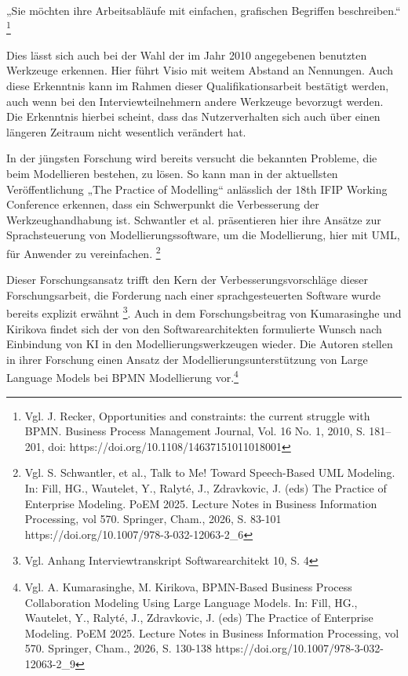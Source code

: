 „Sie möchten ihre Arbeitsabläufe mit einfachen, grafischen Begriffen beschreiben.“
\footnote {Vgl. J. Recker, Opportunities and constraints: the current struggle with BPMN. Business Process Management Journal, Vol. 16 No. 1, 2010, S. 181–201, doi: https://doi.org/10.1108/14637151011018001 }

Dies lässt sich auch bei der Wahl der im Jahr 2010 angegebenen benutzten Werkzeuge erkennen. Hier führt Visio mit weitem Abstand an Nennungen. Auch diese Erkenntnis kann im Rahmen dieser Qualifikationsarbeit bestätigt werden, auch wenn bei den Interviewteilnehmern andere Werkzeuge bevorzugt werden. Die Erkenntnis hierbei scheint, dass das Nutzerverhalten sich auch über einen längeren Zeitraum nicht wesentlich verändert hat.

In der jüngsten Forschung wird bereits versucht die bekannten Probleme, die beim Modellieren bestehen, zu lösen. So kann man in der aktuellsten Veröffentlichung „The Practice of Modelling“ anlässlich der 18th IFIP Working Conference erkennen, dass ein Schwerpunkt die Verbesserung der Werkzeughandhabung ist. Schwantler et al. präsentieren hier ihre Ansätze zur Sprachsteuerung von Modellierungssoftware, um die Modellierung, hier mit UML, für Anwender zu vereinfachen. \footnote {Vgl. S. Schwantler, et al.,  Talk to Me! Toward Speech-Based UML Modeling. In: Fill, HG., Wautelet, Y., Ralyté, J., Zdravkovic, J. (eds) The Practice of Enterprise Modeling. PoEM 2025. Lecture Notes in Business Information Processing, vol 570. Springer, Cham., 2026, S. 83-101 https://doi.org/10.1007/978-3-032-12063-2_6}

Dieser Forschungsansatz trifft den Kern der Verbesserungsvorschläge dieser Forschungsarbeit, die Forderung nach einer sprachgesteuerten Software wurde bereits explizit erwähnt \footnote{Vgl. Anhang Interviewtranskript Softwarearchitekt 10, S. 4}.
Auch in dem Forschungsbeitrag von Kumarasinghe und Kirikova findet sich der von den Softwarearchitekten formulierte Wunsch nach Einbindung von KI in den Modellierungswerkzeugen wieder. Die Autoren stellen in ihrer Forschung einen Ansatz der Modellierungsunterstützung von Large Language Models bei BPMN Modellierung vor.\footnote{Vgl. A. Kumarasinghe, M. Kirikova, BPMN-Based Business Process Collaboration Modeling Using Large Language Models. In: Fill, HG., Wautelet, Y., Ralyté, J., Zdravkovic, J. (eds) The Practice of Enterprise Modeling. PoEM 2025. Lecture Notes in Business Information Processing, vol 570. Springer, Cham., 2026, S. 130-138  https://doi.org/10.1007/978-3-032-12063-2_9}

